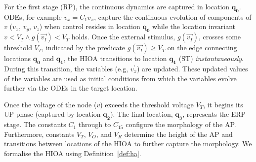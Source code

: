 For the first stage (\ac{RP}), the continuous dynamics are captured in
location $\mathbf{q_0}$. \acfp{ODE}, for example \mbox{$\dot{v_{x}} = 
C_{1}v_{x}$}, capture the continuous evolution of components of $v$ ($v_{x}$, 
$v_{y}$, $v_{z}$) when control resides in location $\mathbf{q_{0}}$ 
while the location invariant $v < V_T \wedge g(\vec{v_{I}}) < V_T$ holds.  Once 
the external
stimulus, $g(\vec{v_{I}})$, crosses some threshold $V_{T}$, indicated by
the predicate \mbox{$g(\vec{v_{I}}) \geq V_{T}$} on the edge connecting
locations $\mathbf{q_{0}}$ and $\mathbf{q_{1}}$, the \ac{HIOA}
transitions to location $\mathbf{q_{1}}$ (\ac{ST})
\textit{instantaneously}. During this transition, the variables (e.g,
$v^{\prime}_{x}$) are updated. These updated values of the variables are
used as initial conditions from which the variables evolve further via
the \acp{ODE} in the target location.

Once the voltage of the node ($v$) exceeds the threshold voltage
$V_{T}$, it begins its \ac{UP} phase (captured by location
$\mathbf{q_2}$). The final location, $\mathbf{q_3}$, represents the
\ac{ERP} stage. The constants $C_1$ through to $C_{15}$ configure the
morphology of the \ac{AP}. Furthermore, constants $V_T$, $V_O$, and
$V_R$ determine the height of the \ac{AP} and transitions between
locations of the \ac{HIOA} to further capture the morphology.
We formalise the \ac{HIOA} using Definition~\ref{def:ha}.


